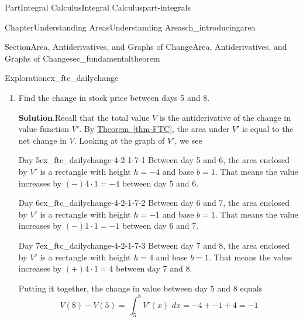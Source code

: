 \documentclass{tufte-book}
\newcommand{\blocktitlefont}{\relax}
\newcommand{\xreffont}{\relax}
\numberwithin{equation}{chapter}
\newcommand{\intdx}[1]{{\,\int#1\,\,dx}}
\newcommand{\dint}[1]{\displaystyle\intdx{#1}}
\begin{document}
\begin{partptx}{Part}{Integral Calculus}{}{Integral Calculus}{}{}{part-integrals}
\begin{chapterptx}{Chapter}{Understanding Areas}{}{Understanding Areas}{}{}{ch_introducingarea}
\begin{sectionptx}{Section}{Area, Antiderivatives, and Graphs of Change}{}{Area, Antiderivatives, and Graphs of Change}{}{}{sec_fundamentaltheorem}
\begin{exploration}{Exploration}{}{ex_ftc_dailychange}
\begin{enumerate}[font=\bfseries,label=(\alph*),ref=\alph*]
\begin{image}{0.25}{0.5}{0.25}{}
{
}%
\end{image}%
\item{}Find the change in stock price between days 5 and 8.%
\par\smallskip%
\noindent\textbf{\blocktitlefont Solution}.\hypertarget{ex_ftc_dailychange-4-2}{}\quad{}Recall that the total value \(V\) is the antiderivative of the change in value function  \(V'\). By \hyperref[thm-FTC]{Theorem~{\xreffont\ref{thm-FTC}}}, the area under \(V'\) is equal to the net change in \(V\).  Looking at the graph of \(V'\), we see%
\begin{descriptionlist}
\begin{dlimedium}{Day 5}{ex_ftc_dailychange-4-2-1-7-1}%
Between day 5 and 6, the area enclosed by \(V'\) is a rectangle with height \(h=-4\) and base \(b=1\). That means the value increases by \((-) 4\cdot 1 = -4 \)\textdollar{} between day 5 and 6.%
\end{dlimedium}%
\begin{dlimedium}{Day 6}{ex_ftc_dailychange-4-2-1-7-2}%
Between day 6 and 7, the area enclosed by \(V'\) is a rectangle with height \(h=-1\) and base \(b=1\). That means the value increases by \((-) 1\cdot 1 = -1 \)\textdollar{} between day 6 and 7.%
\end{dlimedium}%
\begin{dlimedium}{Day 7}{ex_ftc_dailychange-4-2-1-7-3}%
Between day 7 and 8, the area enclosed by \(V'\) is a rectangle with height \(h=4\) and base \(b=1\). That means the value increases by \((+) 4\cdot 1 = 4 \)\textdollar{} between day 7 and 8.%
\end{dlimedium}%
\end{descriptionlist}
Putting it together, the change in value between day 5 and 8 equals%
\begin{equation*}
V(8)-V(5) = \dint{_5^8 V'(x) } = -4 + -1 + 4  = -1
\end{equation*}
%
\begin{image}{0.25}{0.5}{0.25}{}%
\end{image}
\end{enumerate}
\end{exploration}
\end{sectionptx}
\end{chapterptx}
\end{partptx}
\end{document}
